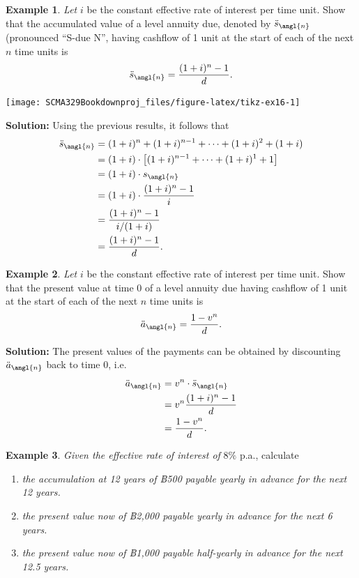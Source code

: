 \documentclass[
]{book}
\theoremstyle{definition}
\theoremstyle{definition}
\newtheorem{example}{Example}[chapter]
\theoremstyle{definition}
\theoremstyle{definition}
\theoremstyle{remark}
\begin{document}
\begin{example}
\emph{Let} \(i\) be the constant effective rate of interest per time unit. Show
that the accumulated value of a level annuity due, denoted by
\(\ddot{s}_\angl{n}\) (pronounced ``S-due N'', having cashflow of 1 unit at
the start of each of the next \(n\) time units is
\[\ddot{s}_\angl{n} = \frac{(1+i)^n -1 }{d}.\]
\end{example}

\begin{center}\texttt{[image: SCMA329Bookdownproj\_files/figure-latex/tikz-ex16-1]} \end{center}

\textbf{Solution:} Using the previous results, it follows that
\[\begin{aligned}
 \ddot{s}_\angl{n} &= (1+i)^n + (1+i)^{n-1} + \cdots + (1+i)^2 + (1+i) \\
            &= (1+i) \cdot \left[(1+i)^{n-1} + \cdots + (1+i)^1 + 1\right] \\
            &= (1+i) \cdot {s}_\angl{n} \\
            &= (1+i) \cdot \frac{(1+i)^n -1 }{i}\\
            &=  \frac{(1+i)^n -1 }{i/(1+i)}\\
            &=  \frac{(1+i)^n -1 }{d}.\end{aligned}\]

\begin{example}
\emph{Let} \(i\) be the constant effective rate of interest per time unit. Show
that the present value at time 0 of a level annuity due having cashflow
of 1 unit at the start of each of the next \(n\) time units is
\[\ddot{a}_\angl{n} =  \frac{1 - v^n }{d}.\]
\end{example}

\textbf{Solution:} The present values of the payments can be obtained by
discounting \(\ddot{a}_\angl{n}\) back to time 0, i.e.~\[\begin{aligned}
 \ddot{a}_\angl{n} &= v^n  \cdot  \ddot{s}_\angl{n} \\
            &= v^n  \frac{(1+i)^n -1 }{d} \\
            &=\frac{1 - v^n}{d}.\end{aligned}\]

\begin{example}

\emph{Given the effective rate of interest of} \(8\%\) p.a., calculate

\begin{enumerate}
\def\labelenumi{\arabic{enumi}.}
\item
  \emph{the accumulation at 12 years of ฿500 payable yearly in advance for
  the next 12 years.}
\item
  \emph{the present value now of ฿2,000 payable yearly in advance for the
  next 6 years.}
\item
  \emph{the present value now of ฿1,000 payable half-yearly in advance for
  the next 12.5 years.}
\end{enumerate}

\end{example}
\end{document}
